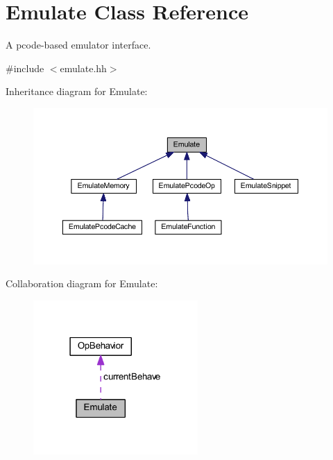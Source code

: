 \hypertarget{class_emulate}{}\section{Emulate Class Reference}
\label{class_emulate}


A pcode-\/based emulator interface.  




{\ttfamily \#include $<$emulate.\+hh$>$}



Inheritance diagram for Emulate\+:
\nopagebreak
\begin{figure}[H]
\begin{center}
\leavevmode
\includegraphics[width=350pt]{class_emulate__inherit__graph}
\end{center}
\end{figure}


Collaboration diagram for Emulate\+:
\nopagebreak
\begin{figure}[H]
\begin{center}
\leavevmode
\includegraphics[width=178pt]{class_emulate__coll__graph}
\end{center}
\end{figure}
